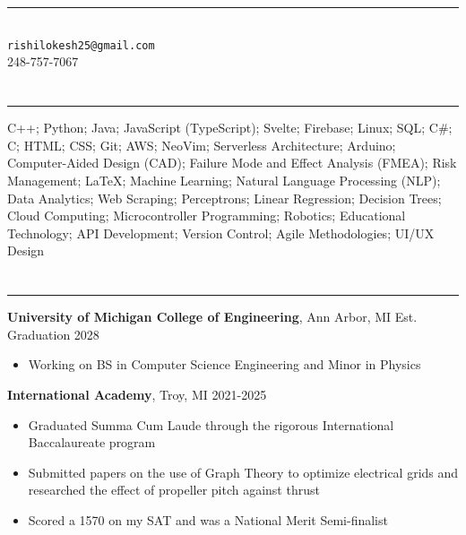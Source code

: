 \documentclass{article}[11pt]
\newcommand{\underlinedsection}[1]{ \section*{\sc{#1}}
	\rule{\textwidth}{1pt} }
\newenvironment{denseitemize} %
{ \begin{itemize}[leftmargin = 20pt, topsep = 0pt, itemsep = 0pt] }
{\end{itemize} }
\newcommand{\education}[3]{ {\textbf{#1}, {#2} \hfill {#3}} }
\begin{document}
\normalsize
\singlespacing

\section*{\centering {}} 
\begin{center}
\rule{3in}{1pt} \\
\texttt{rishilokesh25@gmail.com} \\
248-757-7067 
\end{center} 

\underlinedsection{Skills}
C++; Python; Java; JavaScript (TypeScript); Svelte; Firebase; Linux; SQL; C#; C; HTML; CSS; Git; AWS; NeoVim; Serverless Architecture; Arduino; Computer-Aided Design (CAD); Failure Mode and Effect Analysis (FMEA); Risk Management; LaTeX; Machine Learning; Natural Language Processing (NLP); Data Analytics; Web Scraping; Perceptrons; Linear Regression; Decision Trees; Cloud Computing; Microcontroller Programming; Robotics; Educational Technology; API Development; Version Control; Agile Methodologies; UI/UX Design

\underlinedsection{Education}
\education{University of Michigan College of Engineering}{Ann Arbor, MI}{Est. Graduation 2028}

\begin{denseitemize}
	\item Working on BS in Computer Science Engineering and Minor in Physics 
\end{denseitemize}
\education{International Academy}{Troy, MI}{2021-2025}
\begin{denseitemize}
	\item Graduated Summa Cum Laude through the rigorous International Baccalaureate program 
        \item Submitted papers on the use of Graph Theory to optimize electrical grids and researched the effect of propeller pitch against thrust
        \item Scored a 1570 on my SAT and was a National Merit Semi-finalist

\end{denseitemize}
\end{document}
